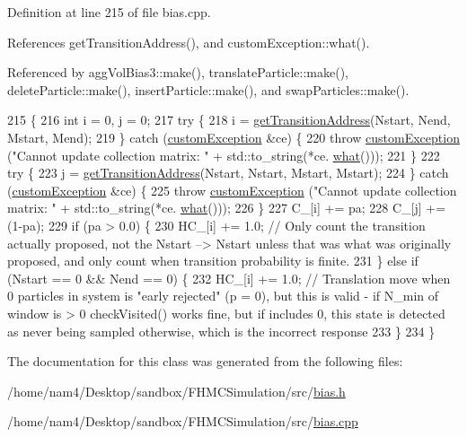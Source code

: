 Definition at line 215 of file bias.\-cpp.



References get\-Transition\-Address(), and custom\-Exception\-::what().



Referenced by agg\-Vol\-Bias3\-::make(), translate\-Particle\-::make(), delete\-Particle\-::make(), insert\-Particle\-::make(), and swap\-Particles\-::make().


\begin{DoxyCode}
215                                                                                                        \{
216     \textcolor{keywordtype}{int} i = 0, j = 0;
217     \textcolor{keywordflow}{try} \{
218         i = \hyperlink{classtmmc_a8649336b47195c6ad50c437ff1f443e3}{getTransitionAddress}(Nstart, Nend, Mstart, Mend);
219     \} \textcolor{keywordflow}{catch} (\hyperlink{classcustom_exception}{customException} &ce) \{
220         \textcolor{keywordflow}{throw} \hyperlink{classcustom_exception}{customException} (\textcolor{stringliteral}{"Cannot update collection matrix: "} + std::to\_string(*ce.
      \hyperlink{classcustom_exception_aeb6ab5848b038adfc68fde86a512f691}{what}()));
221     \}
222     \textcolor{keywordflow}{try} \{
223         j = \hyperlink{classtmmc_a8649336b47195c6ad50c437ff1f443e3}{getTransitionAddress}(Nstart, Nstart, Mstart, Mstart);
224     \} \textcolor{keywordflow}{catch} (\hyperlink{classcustom_exception}{customException} &ce) \{
225         \textcolor{keywordflow}{throw} \hyperlink{classcustom_exception}{customException} (\textcolor{stringliteral}{"Cannot update collection matrix: "} + std::to\_string(*ce.
      \hyperlink{classcustom_exception_aeb6ab5848b038adfc68fde86a512f691}{what}()));
226     \}
227     C\_[i] += pa;
228     C\_[j] += (1-pa);
229     \textcolor{keywordflow}{if} (pa > 0.0) \{
230         HC\_[i] += 1.0; \textcolor{comment}{// Only count the transition actually proposed, not the Nstart --> Nstart unless
       that was what was originally proposed, and only count when transition probability is finite.}
231     \} \textcolor{keywordflow}{else} \textcolor{keywordflow}{if} (Nstart == 0 && Nend == 0) \{
232         HC\_[i] += 1.0; \textcolor{comment}{// Translation move when 0 particles in system is "early rejected" (p = 0), but this
       is valid - if N\_min of window is > 0 checkVisited() works fine, but if includes 0, this state is detected
       as never being sampled otherwise, which is the incorrect response}
233     \}
234 \}
\end{DoxyCode}


The documentation for this class was generated from the following files\-:\begin{DoxyCompactItemize}
\item 
/home/nam4/\-Desktop/sandbox/\-F\-H\-M\-C\-Simulation/src/\hyperlink{bias_8h}{bias.\-h}\item 
/home/nam4/\-Desktop/sandbox/\-F\-H\-M\-C\-Simulation/src/\hyperlink{bias_8cpp}{bias.\-cpp}\end{DoxyCompactItemize}
